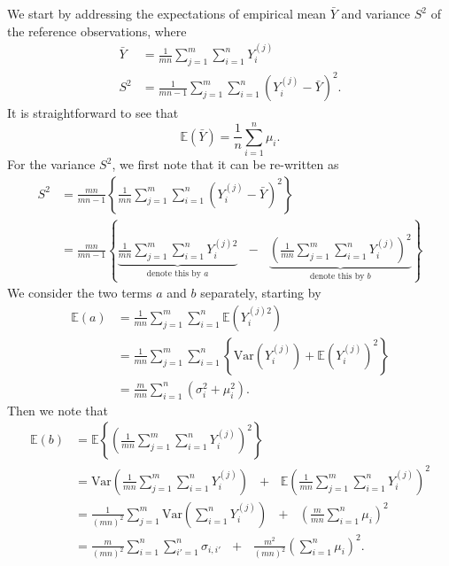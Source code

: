 \documentclass{article}
\newcommand{\sd}{s}
\begin{document}
We start by addressing the expectations of empirical mean $\bar{Y}$ and variance $S^2$ of the reference observations, where
\begin{align*}
\bar{Y} & = \frac{1}{mn} \sum_{j = 1}^m \sum_{i = 1}^n Y_i^{(j)}\\
S^2 & = \frac{1}{mn - 1} \sum_{j = 1}^m \sum_{i = 1}^n \left(Y_i^{(j)} - \bar{Y}\right)^2.
\end{align*}
It is straightforward to see that 
\begin{equation}
\mathbb{E}(\bar{Y}) = \frac{1}{n} \sum_{i = 1}^n \mu_i.
\end{equation}
For the variance $S^2$, we first note that it can be re-written as
\begin{align}
S^2 & = \frac{mn}{mn - 1} \left\{\frac{1}{mn} \sum_{j = 1}^m \sum_{i = 1}^n \left(Y_i^{(j)} - \bar{Y}\right)^2 \right\}\\
& = \frac{mn}{mn - 1} \left\{ \underbrace{\frac{1}{mn} \sum_{j = 1}^m \sum_{i = 1}^n Y_i^{(j)2}}_{\text{denote this by } a} \ \ \ - \ \ \ \underbrace{\left(\frac{1}{mn} \sum_{j = 1}^m \sum_{i = 1}^n Y_i^{(j)} \right)^2}_{\text{denote this by } b} \right\} \label{eq:sigma2hat}
\end{align}
We consider the two terms $a$ and $b$ separately, starting by
\begin{align*}
\mathbb{E}(a) & = \frac{1}{mn} \sum_{j = 1}^m \sum_{i = 1}^n \mathbb{E}\left(Y_i^{(j)2}\right)\\
& = \frac{1}{mn} \sum_{j = 1}^m \sum_{i = 1}^n \left\{ \text{Var}\left(Y_i^{(j)}\right) + \mathbb{E}\left(Y_i^{(j)}\right)^2 \right\}\\
& = \frac{m}{mn} \sum_{i = 1}^n (\sigma_{i}^2 + \mu_i^2).
\end{align*}
Then we note that
\begin{align*}
\mathbb{E}(b) & = \mathbb{E}\left\{\left(\frac{1}{mn} \sum_{j = 1}^m \sum_{i = 1}^n Y_i^{(j)} \right)^2\right\}\\
& = \text{Var}\left( \frac{1}{mn} \sum_{j = 1}^m \sum_{i = 1}^n Y_i^{(j)} \right) \ \ \ + \ \ \ \mathbb{E}\left(\frac{1}{mn}  \sum_{j = 1}^m \sum_{i = 1}^n Y_i^{(j)} \right)^2\\
& = \frac{1}{(mn)^2}\sum_{j = 1}^m \text{Var}\left(\sum_{i = 1}^n Y_i^{(j)} \right) \ \ \ + \ \ \ \left(\frac{m}{mn} \sum_{i = 1}^n \mu_i\right)^2\\
& = \frac{m}{(mn)^2} \sum_{i = 1}^n \sum_{i' = 1}^n \sigma_{i,i'} \ \ \ + \ \ \ \frac{m^2}{(mn)^2}\left(\sum_{i = 1}^n \mu_i\right)^2.
\end{align*}
\end{document}
